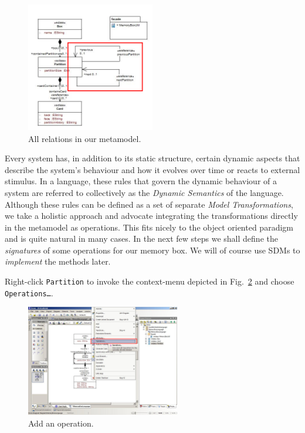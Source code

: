 \begin{figure}[htbp]
	\centering
  \includegraphics[width=0.5\textwidth]{pics/memBox34.png}
	\caption{All relations in our metamodel.}
	\label{fig:ereferences_all}  
\end{figure}

\clearpage

Every system has, in addition to its static structure, certain dynamic aspects
that describe the system's behaviour and how it evolves over time or reacts to
external stimulus.
In a language, these rules that govern the dynamic behaviour of a system are
referred to collectively as the \emph{Dynamic Semantics} of the language.  
Although these rules can be defined as a set of separate \emph{Model
Transformations}, we take a holistic approach and advocate integrating the
transformations directly in the metamodel as operations.
This fits nicely to the object oriented paradigm and is quite natural in many
cases.  In the next few steps we shall define the \emph{signatures} of some
operations for our memory box.  We will of course use SDMs to \emph{implement}
the methods later.

Right-click \texttt{Partition} to invoke the context-menu depicted in
Fig.~\ref{fig:add_operation} and choose \texttt{Operations\ldots}.

\begin{figure}[htbp]
	\centering
  \includegraphics[width=0.6\textwidth]{pics/memBox35.png}
	\caption{Add an operation.}
	\label{fig:add_operation}
\end{figure}
 
